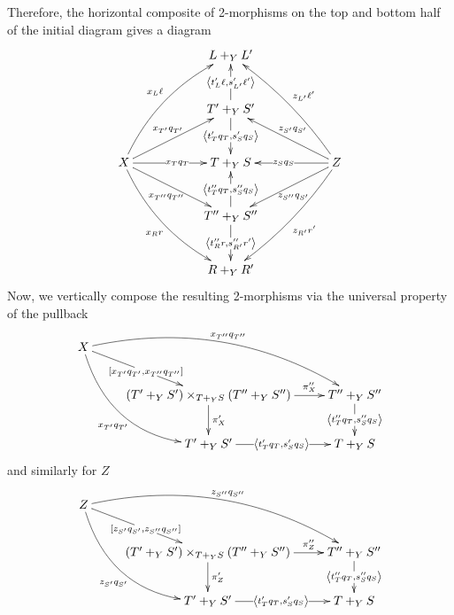 \documentclass[12pt]{article}
\renewcommand{\(}{\left(}
\renewcommand{\)}{\right)}
\renewcommand{\{}{\left\lbrace}
\renewcommand{\}}{\right\rbrace}
\theoremstyle{remark}
\theoremstyle{definition}
\begin{document}
Therefore, the horizontal composite of 2-morphisms on the top and bottom half of the initial diagram gives a diagram
\begin{equation} \label{Diag:HV_HorComposite}
	\xymatrix@R=1cm{
		{} &
		{} &
		L +_Y L' &
		{} &
		{}  \\
		{} &
		{} &
		T' +_Y S' 
			\ar[u]|{\left\langle t'_{L}\ell, s'_{L'}\ell'  \right\rangle }
			\ar[d]|{\left\langle t'_Tq_T, s'_Sq_S \right\rangle } &
		{} &
		{} \\
		X 
			\ar@/^1pc/[rruu]^{x_L \ell}
			\ar[rru]^{x_{T'} q_{T'}}
			\ar[rr]|{x_Tq_T}
			\ar[rrd]_{x_{T''}q_{T''}}
			\ar@/_1pc/[rrdd]_{x_Rr} &
		{} &	
		T +_Y S &
		{} &	
		Z 
			\ar@/_/[lluu]_{z_{L'}\ell' }
			\ar[llu]_{z_{S'}q_{S'}}
			\ar[ll]|{z_Sq_S}
			\ar[lld]^{z_{S''}q_{S'}}
			\ar@/^/[lldd]^{z_{R'}r'} \\
		{} &
		{} &
		T'' +_Y S'' 
			\ar[u]|{\left\langle t''_Tq_T, s''_Sq_S \right\rangle }
			\ar[d]|{\left\langle t''_{R}r,s''_{R'}r'  \right\rangle } &
		{} &
		{} \\	
		{} &
		{} &
		R +_Y R' &
		{} &
		{} \\ 
	}
\end{equation}
Now, we vertically compose the resulting 2-morphisms via the universal property of the pullback
\begin{equation} \label{Diag:HV_XToPullback}
	\xymatrix{
		X
			\ar@/^2pc/[rrd]^{x_{T''}q_{T''}}
			\ar[rd]|{\left[ x_{T'}q_{T'} ,x_{T''}q_{T''} \right]}
			\ar@/_2pc/[rdd]_{x_{T'}q_{T'}} &
		{} &
		{} \\
		{} &
		(T' +_Y S') \times_{T +_Y S} (T'' +_Y S'') 
			\ar[r]^-{\pi''_X} 
			\ar[d]^{\pi'_X} &
		T'' +_Y S'' 
			\ar[d]|{\left\langle t''_Tq_T, s''_Sq_S \right\rangle } \\
		{} &
		T' +_Y S' 
			\ar[r]|{\left\langle t'_Tq_T, s'_Sq_S \right\rangle } &
		T +_Y S
	}
\end{equation}
and similarly for $Z$
\begin{equation} \label{ZToPullback}
	\xymatrix{
		Z
				\ar@/^2pc/[rrd]^{z_{S''}q_{S''}}
				\ar[rd]|{\left[ z_{S'}q_{S'} ,z_{S''}q_{S''} \right]}
				\ar@/_2pc/[rdd]_{z_{S'}q_{S'}} &
			{} &
			{} \\
			{} &
		(T' +_Y S') \times_{T +_Y S} (T'' +_Y S'') 
			\ar[r]^-{\pi_Z''}
			\ar[d]^{\pi_Z'} &
		T'' +_Y S'' 
			\ar[d]|{\left\langle t''_Tq_T, s''_Sq_S \right\rangle } \\
			{} &
		T' +_Y S' 
			\ar[r]|{\left\langle t'_Tq_T, s'_Sq_S \right\rangle } &
		T +_Y S
	}
\end{equation}
\end{document}
